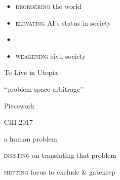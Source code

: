 \documentclass[aspectratio=43,17pt]{beamer} %
\begin{document}
\begin{frame}[plain]


\begin{itemize}
  \item {\scshape reordering} the world
  \item {\scshape elevating} AI's status in society
  \item {}
  \item {\scshape weakening} civil society
\end{itemize}

\end{frame}


\begin{frame}[standout]

To Live in  Utopia

\end{frame}

\begin{frame}[plain]
    \centering



\end{frame}



\begin{frame}[plain]

\centering

``problem space arbitrage''
    
\end{frame}


\begin{frame}[plain]
\begin{enumerate}
\end{enumerate}
\end{frame}

\begin{frame}[standout]
Piecework

\hfill \alert{\small CHI 2017}
\end{frame}


\begin{frame}[plain]

  \centering
  { a human problem}

  {{\scshape insisting} on translating that problem}

  {{\scshape shifting} focus to exclude \& gatekeep}

\end{frame}
\end{document}
